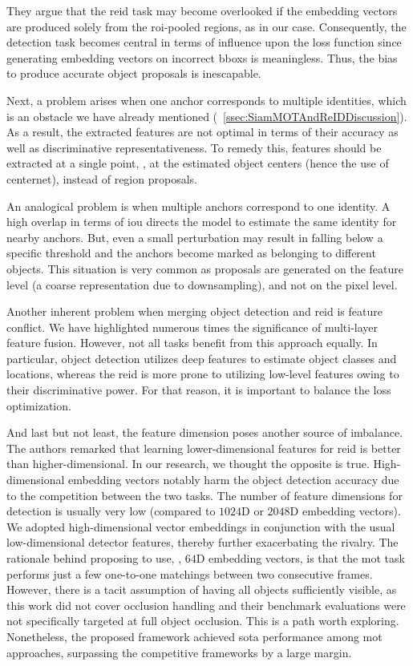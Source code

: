 They argue that the \gls{reid} task may become overlooked if the embedding vectors are produced solely from the \gls{roi}-pooled regions, as in our case. Consequently, the detection task becomes central in terms of influence upon the loss function since generating embedding vectors on incorrect \glspl{bbox} is meaningless. Thus, the bias to produce accurate object proposals is inescapable.

Next, a problem arises when one anchor corresponds to multiple identities, which is an obstacle we have already mentioned (\sectiontext{}~\ref{ssec:SiamMOTAndReIDDiscussion}). As a result, the extracted features are not optimal in terms of their accuracy as well as discriminative representativeness. To remedy this, features should be extracted at a single point, \ietext{}, at the estimated object centers (hence the use of \gls{centernet}), instead of region proposals.

An analogical problem is when multiple anchors correspond to one identity. A high overlap in terms of \gls{iou} directs the model to estimate the same identity for nearby anchors. But, even a small perturbation may result in falling below a specific threshold and the anchors become marked as belonging to different objects. This situation is very common as proposals are generated on the feature level (a coarse representation due to downsampling), and not on the pixel level.

Another inherent problem when merging object detection and \gls{reid} is feature conflict. We have highlighted numerous times the significance of multi-layer feature fusion. However, not all tasks benefit from this approach equally. In particular, object detection utilizes deep features to estimate object classes and locations, whereas the \gls{reid} is more prone to utilizing low-level features owing to their discriminative power. For that reason, it is important to balance the loss optimization.

And last but not least, the feature dimension poses another source of imbalance. The authors remarked that learning lower-dimensional features for \gls{reid} is better than higher-dimensional. In our research, we thought the opposite is true. High-dimensional embedding vectors notably harm the object detection accuracy due to the competition between the two tasks. The number of feature dimensions for detection is usually very low (compared to $1024$D or $2048$D embedding vectors). We adopted high-dimensional vector embeddings in conjunction with the usual low-dimensional detector features, thereby further exacerbating the rivalry. The rationale behind proposing to use, \egtext{}, $64$D embedding vectors, is that the \gls{mot} task performs just a few one-to-one matchings between two consecutive frames. However, there is a tacit assumption of having all objects sufficiently visible, as this work did not cover occlusion handling and their benchmark evaluations were not specifically targeted at full object occlusion. This is a path worth exploring. Nonetheless, the proposed framework achieved \gls{sota} performance among \gls{mot} approaches, surpassing the competitive frameworks by a large margin.
